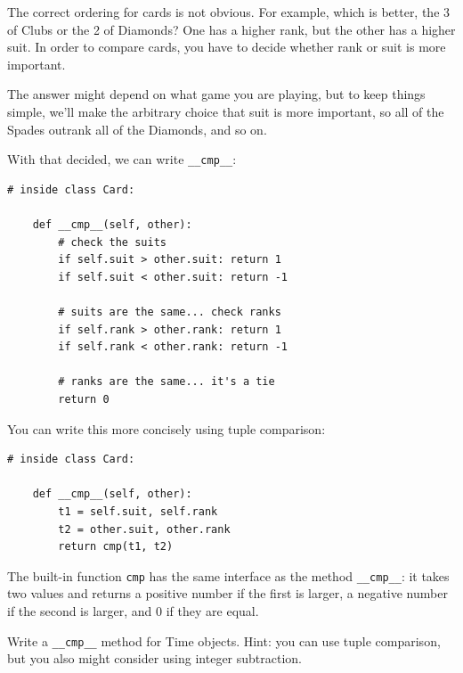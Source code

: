 \documentclass[10pt]{book}
\begin{document}
{

The correct ordering for cards is not obvious.
For example, which
is better, the 3 of Clubs or the 2 of Diamonds?  One has a higher
rank, but the other has a higher suit.  In order to compare
cards, you have to decide whether rank or suit is more important.

The answer might depend on what game you are playing, but to keep
things simple, we'll make the arbitrary choice that suit is more
important, so all of the Spades outrank all of the Diamonds,
and so on.


With that decided, we can write \verb"__cmp__":

\beforeverb
\begin{verbatim}
# inside class Card:

    def __cmp__(self, other):
        # check the suits
        if self.suit > other.suit: return 1
        if self.suit < other.suit: return -1

        # suits are the same... check ranks
        if self.rank > other.rank: return 1
        if self.rank < other.rank: return -1

        # ranks are the same... it's a tie
        return 0    
\end{verbatim}
\afterverb
%
You can write this more concisely using tuple comparison:


\beforeverb
\begin{verbatim}
# inside class Card:

    def __cmp__(self, other):
        t1 = self.suit, self.rank
        t2 = other.suit, other.rank
        return cmp(t1, t2)
\end{verbatim}
\afterverb
%
The built-in function {\tt cmp} has the same interface as
the method \verb"__cmp__": it takes two values and returns
a positive number if the first is larger, a negative number
if the second is larger, and 0 if they are equal.



\begin{ex}
Write a \verb"__cmp__" method for Time objects.  Hint: you
can use tuple comparison, but you also might consider using
integer subtraction.



\end{ex}}
\end{document}

